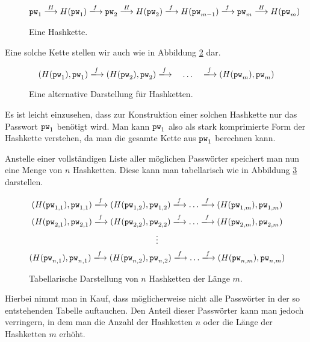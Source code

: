 \newcommand{\RTF}[1][]{\mathit{f}\if!#1!\else_{#1}\fi}
\newcommand{\VRTF}[1][]{\xlongrightarrow{\RTF[#1]}}
\newcommand{\hasharrow}{\stackrel{H}{\longrightarrow}}
\begin{figure}[h]
  \begin{equation*} \pw_1 \hasharrow H(\pw_1) \VRTF \pw_2
    \hasharrow H(\pw_2) \VRTF %
    H(\pw_{m-1}) \VRTF \pw_m \hasharrow H(\pw_m)
  \end{equation*}
  \caption{Eine Hashkette.}
  \label{fig:auth:hashchain}
\end{figure}

Eine solche Kette stellen wir auch wie in Abbildung
\ref{fig:auth:hashchainalternative} dar.

\begin{figure}[h]
  \begin{equation*} (H(\pw_{1}),\pw_{1}) \VRTF
    (H(\pw_{2}),\pw_{2}) \VRTF\quad \ldots \quad \VRTF (H(\pw_{m}),\pw_{m})
  \end{equation*}
  \caption{Eine alternative Darstellung für Hashketten.}
  \label{fig:auth:hashchainalternative}
\end{figure}

Es ist leicht einzusehen, dass zur Konstruktion einer solchen Hashkette
nur das Passwort $\texttt{pw}_1$ benötigt wird. Man kann $\texttt{pw}_1$ also als stark
komprimierte Form der Hashkette verstehen, da man die gesamte Kette aus
$\texttt{pw}_1$ berechnen kann.

Anstelle einer vollständigen Liste aller möglichen Passwörter speichert
man nun eine Menge von $n$ Hashketten. Diese kann man tabellarisch wie
in Abbildung \ref{fig:auth:hashchains} darstellen.

\begin{figure}[h]
  \begin{gather*} (H(\pw_{1,1}),\pw_{1,1}) \VRTF
    (H(\pw_{1,2}),\pw_{1,2}) \VRTF\ldots\VRTF (H(\pw_{1,m}),\pw_{1,m})\\
    (H(\pw_{2,1}),\pw_{2,1}) \VRTF (H(\pw_{2,2}),\pw_{2,2}) \VRTF\ldots\VRTF
    (H(\pw_{2,m}),\pw_{2,m})\\ 
    \vdots\\ 
    (H(\pw_{n,1}),\pw_{n,1}) \VRTF
    (H(\pw_{n,2}),\pw_{n,2}) \VRTF\ldots\VRTF (H(\pw_{n,m}),\pw_{n,m})
  \end{gather*}
  \caption{Tabellarische Darstellung von $n$ Hashketten der Länge
    $m$.}
  \label{fig:auth:hashchains}
\end{figure}

Hierbei nimmt man in Kauf, dass möglicherweise nicht alle Passwörter in
der so entstehenden Tabelle auftauchen. Den Anteil dieser Passwörter
kann man jedoch verringern, in dem man die Anzahl der Hashketten $n$
oder die Länge der Hashketten $m$ erhöht.

